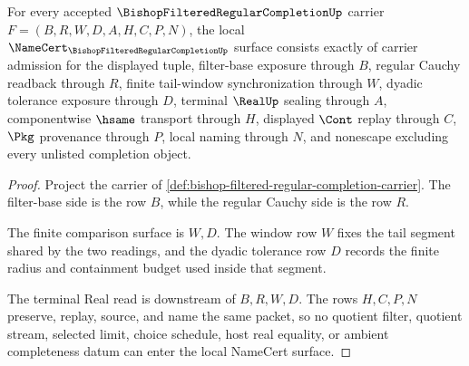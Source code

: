 \begin{theorem}
\label{thm:bishop-filtered-regular-completion-obligations}
For every accepted $\BishopFilteredRegularCompletionUp$ carrier $F=(B,R,W,D,A,H,C,P,N)$, the local $\NameCert_{\BishopFilteredRegularCompletionUp}$ surface consists exactly of carrier admission for the displayed tuple, filter-base exposure through $B$, regular Cauchy readback through $R$, finite tail-window synchronization through $W$, dyadic tolerance exposure through $D$, terminal $\RealUp$ sealing through $A$, componentwise $\hsame$ transport through $H$, displayed $\Cont$ replay through $C$, $\Pkg$ provenance through $P$, local naming through $N$, and nonescape excluding every unlisted completion object.
\end{theorem}
\begin{proof}
Project the carrier of \autoref{def:bishop-filtered-regular-completion-carrier}. The filter-base side is the row $B$, while the regular Cauchy side is the row $R$.

The finite comparison surface is $W,D$. The window row $W$ fixes the tail segment shared by the two readings, and the dyadic tolerance row $D$ records the finite radius and containment budget used inside that segment.

The terminal Real read is downstream of $B,R,W,D$. The rows $H,C,P,N$ preserve, replay, source, and name the same packet, so no quotient filter, quotient stream, selected limit, choice schedule, host real equality, or ambient completeness datum can enter the local NameCert surface.
\end{proof}

